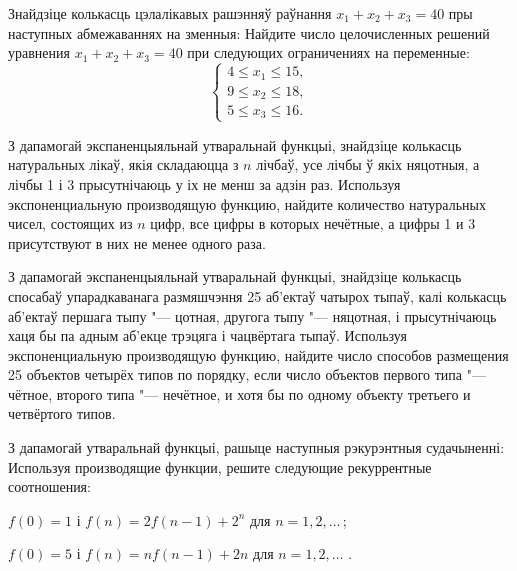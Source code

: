 \begin{problemList}
\bigskip

\problemItemWithCommonPart
{Знайдзіце колькасць цэлалікавых рашэнняў раўнання $x_1 + x_2 + x_3 = 40$ пры наступных
абмежаваннях на зменныя:}
{Найдите число целочисленных решений уравнения $x_1 + x_2 + x_3 = 40$ при
следующих ограничениях на переменные:}
{%
	$$
	\begin{cases}
	4 \le x_1 \le 15, \\ 9 \le x_2 \le 18, \\ 5 \le x_3 \le 16.
	\end{cases}
	$$
}

\smallskip

\problemItemSimple
{З дапамогай экспаненцыяльнай утваральнай функцыі, знайдзіце колькасць натуральных лікаў,
якія складаюцца з $n$ лічбаў, усе лічбы ў якіх няцотныя, а лічбы 1 і 3 прысутнічаюць у іх
не менш за адзін раз.}
{Используя экспоненциальную производящую функцию, найдите количество
натуральных чисел, состоящих из $n$ цифр, все цифры в которых нечётные, а цифры 1 и 3
присутствуют в них не менее одного раза.}

\bigskip

\problemItemSimple
{З дапамогай экспаненцыяльнай утваральнай функцыі, знайдзіце колькасць спосабаў упарадкаванага размяшчэння
25 аб'ектаў чатырох тыпаў, калі колькасць аб'ектаў першага тыпу "--- цотная, другога тыпу "--- няцотная,
і прысутнічаюць хаця бы па адным аб'екце трэцяга і чацвёртага тыпаў.}
{Используя экспоненциальную производящую функцию, найдите число способов
размещения 25 объектов четырёх типов по порядку, если число объектов первого
типа "--- чётное, второго типа "--- нечётное, и хотя бы по одному объекту третьего и
четвёртого типов.}

\bigskip

\problemItemWithCommonPart
{З дапамогай утваральнай функцыі, рашыце наступныя рэкурэнтныя судачыненні:}
{Используя производящие функции, решите следующие рекуррентные соотношения:}
{%
\begin{belarusianEnumerate}
  \item $f(0) = 1$ і $f(n) = 2f(n - 1) + 2^n$ для $n = 1, 2, \ldots\, $;
  \item $f(0) = 5$ і $f(n) = nf(n - 1) + 2n$ для $n = 1, 2, \ldots\,\, $.
\end{belarusianEnumerate}
}

\end{problemList}


